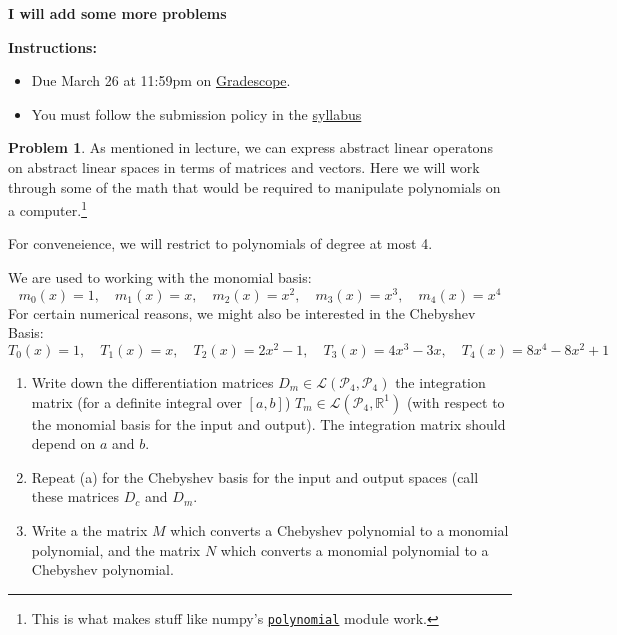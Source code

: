 \documentclass[12pt]{article}
\theoremstyle{definition}
\newtheorem{problem}{Problem}
\begin{document}
\textbf{\Large{}}
    
\vspace{-1.8em}
\hrulefill

{\color{red}\textbf{I will add some more problems}}


\textbf{Instructions:}
    \begin{itemize}
        \item Due March 26 at 11:59pm on \href{https://www.gradescope.com/courses/709136}{Gradescope}.
        \item You must follow the submission policy in the \href{https://courses.chen.pw/la_s2024/syllabus.html}{syllabus} 
\end{itemize}
   
\vspace{.5em}


\begin{problem}
As mentioned in lecture, we can express abstract linear operatons on abstract linear spaces in terms of matrices and vectors. 
Here we will work through some of the math that would be required to manipulate polynomials on a computer.\footnote{This is what makes stuff like numpy's \href{https://numpy.org/doc/stable/reference/routines.polynomials.html}{\texttt{polynomial}} module work.}

For conveneience, we will restrict to polynomials of degree at most 4.

We are used to working with the monomial basis:
\[
m_0(x) = 1, \quad
m_1(x) = x, \quad
m_2(x) = x^2, \quad
m_3(x) = x^3, \quad
m_4(x) = x^4
\]
For certain numerical reasons, we might also be interested in the Chebyshev Basis:
\[
T_0(x) = 1, \quad
T_1(x) = x, \quad
T_2(x) = 2x^2 - 1, \quad
T_3(x) = 4x^3 - 3x, \quad
T_4(x) = 8x^4 - 8x^2 + 1    
\]

\begin{enumerate}
    \item Write down the differentiation matrices $D_m\in \mathcal{L}(\mathcal{P}_4,\mathcal{P}_4)$ the integration matrix (for a definite integral over $[a,b]$) $T_m \in \mathcal{L}(\mathcal{P}_4,\mathbb{R}^1)$ (with respect to the monomial basis for the input and output). The integration matrix should depend on $a$ and $b$.
    \item Repeat (a) for the Chebyshev basis for the input and output spaces (call these matrices $D_c$ and $D_m$.
    \item Write a the matrix $M$ which converts a Chebyshev polynomial to a monomial polynomial, and the matrix $N$ which converts a monomial polynomial to a Chebyshev polynomial. 
\end{enumerate}

    
\end{problem}
\end{document}

